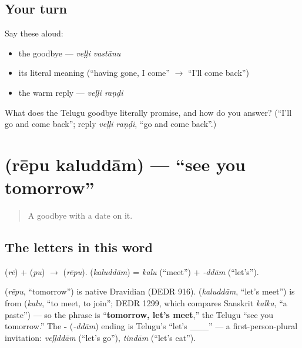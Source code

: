\subsection*{Your turn}
Say these aloud:

\begin{itemize}
\raggedright
  \item the goodbye — \emph{veḷḷi vastānu}
  \item its literal meaning (\textquotedblleft{}having gone, I come\textquotedblright{} $\to$ \textquotedblleft{}I'll come back\textquotedblright{})
  \item the warm reply — \emph{veḷḷi raṇḍi}
\end{itemize}

\begin{tcolorbox}[breakable,colback=teal!4,colframe=teal!35!black,title={Before you move on}]
What does the Telugu goodbye literally promise, and how do you answer? (\textquotedblleft{}I'll go and come back\textquotedblright{}; reply \emph{veḷḷi raṇḍi}, \textquotedblleft{}go and come back\textquotedblright{}.)
\end{tcolorbox}
\section[\texorpdfstring{\te{రేపు} \te{కలుద్దాం} (rēpu kaluddām)}{రేపు కలుద్దాం (rēpu kaluddām)}]{  (rēpu kaluddām) — \textquotedblleft{}see you tomorrow\textquotedblright{}}

\label{lesson:TE-C04-reepu-kaluddaam}



\begin{quote}
A goodbye with a date on it.
\end{quote}

\subsection*{The letters in this word}
\textbf{} (\emph{rē}) + \textbf{} (\emph{pu}) $\to$ \textbf{} (\emph{rēpu}). \textbf{} (\emph{kaluddām}) = \emph{kalu} (\textquotedblleft{}meet\textquotedblright{}) + \emph{-ddām} (\textquotedblleft{}let's\textquotedblright{}).

\begin{cousinweb}
\textbf{} (\emph{rēpu}, \textquotedblleft{}tomorrow\textquotedblright{}) is native Dravidian (DEDR 916). \textbf{} (\emph{kaluddām}, \textquotedblleft{}let's meet\textquotedblright{}) is from \textbf{} (\emph{kalu}, \textquotedblleft{}to meet, to join\textquotedblright{}; DEDR 1299, which compares Sanskrit \emph{kalka}, \textquotedblleft{}a paste\textquotedblright{}) — so the phrase is \textquotedblleft{}\textbf{tomorrow, let's meet},\textquotedblright{} the Telugu \textquotedblleft{}see you tomorrow.\textquotedblright{} The \textbf{-} (\emph{-ddām}) ending is Telugu's \textquotedblleft{}let's \_\_\_\textquotedblright{} — a first-person-plural invitation: \emph{veḷḷddām} (\textquotedblleft{}let's go\textquotedblright{}), \emph{tindām} (\textquotedblleft{}let's eat\textquotedblright{}).
\end{cousinweb}

